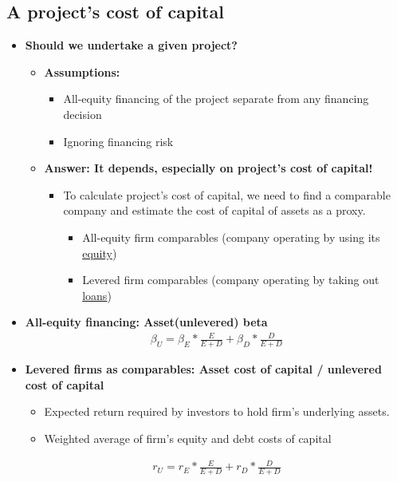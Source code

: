 \documentclass[ieeetran]{article}
\begin{document}
\subsection{A project's cost of capital} %
\label{sub:a_project_}
\begin{itemize}
  \item \textbf{Should we undertake a given project?}
	  \begin{itemize}
	    \item \textbf{Assumptions:}
		    \begin{itemize}
		      \item All-equity financing of the project separate from any financing decision
			      \item Ignoring financing risk
		    \end{itemize}

\item \textbf{Answer: It depends, especially on project's cost of capital!}
	\begin{itemize}
	  \item To calculate project's cost of capital, we need to find a comparable company and estimate the cost of capital of assets as a proxy.
		  \begin{itemize}
		    \item All-equity firm comparables (company operating by using its \underline{equity})
		    \item Levered firm comparables (company operating by taking out \underline{loans})
		  \end{itemize}
	\end{itemize}
	  \end{itemize}
\item \textbf{All-equity financing: Asset(unlevered) beta}
	\large
	\begin{equation*}
	\boxed{
	\begin{aligned}
	\beta_U = \beta_E * \frac{E}{E + D} + \beta_D * \frac{D}{E+D}
	\end{aligned}
	}
	\end{equation*}
	\normalsize
	
\item \textbf{Levered firms as comparables: Asset cost of capital / unlevered cost of capital}
	\begin{itemize}
	  \item Expected return required by investors to hold firm's underlying assets.
	\item Weighted average of firm's equity and debt costs of capital
	\end{itemize}
	\large
	\begin{equation*}
	\boxed{
	\begin{aligned}
	r_U = r_E * \frac{E}{E + D} + r_D * \frac{D}{E + D}
	\end{aligned}
	}
	\end{equation*}
	\normalsize
	
\end{itemize}
\end{document}
